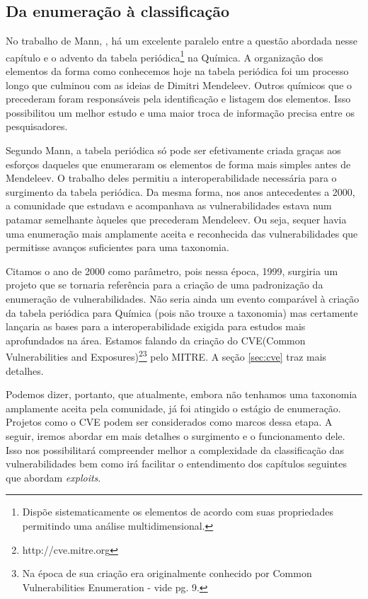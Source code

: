 		\subsection{Da enumeração à classificação}
			No trabalho de Mann, \cite{Mann1999}, há um excelente paralelo entre a
			questão abordada nesse capítulo e o advento da tabela 
			periódica\footnote{Dispõe sistematicamente os elementos de acordo com suas propriedades permitindo
			uma análise multidimensional.} na Química. 
			A organização dos elementos da forma como conhecemos hoje na tabela periódica
			foi um processo longo que culminou com as ideias de Dimitri Mendeleev.
			Outros químicos que o precederam foram responsáveis pela identificação e
			listagem dos elementos. Isso possibilitou um melhor estudo e uma maior
			troca de informação precisa entre os pesquisadores.


			Segundo Mann, a tabela periódica só pode ser efetivamente criada graças
			aos esforços daqueles que enumeraram os elementos de forma mais simples
			antes de Mendeleev. O trabalho deles permitiu a interoperabilidade
			necessária para o surgimento da tabela periódica.
			Da mesma forma, nos anos antecedentes a 2000, a comunidade que estudava
			e acompanhava as vulnerabilidades estava num patamar semelhante àqueles
			que precederam Mendeleev. Ou seja, sequer havia uma enumeração mais
			amplamente aceita e reconhecida das vulnerabilidades que permitisse
			avanços suficientes para uma taxonomia.

			
			Citamos o ano de 2000 como parâmetro, pois nessa época, 1999, surgiria um projeto
			que se tornaria referência para a criação de uma padronização da enumeração
			de vulnerabilidades. Não seria ainda um evento comparável à criação da
			tabela periódica para Química (pois não trouxe a taxonomia) 
			mas certamente lançaria as bases para
			a interoperabilidade exigida para estudos mais aprofundados na área.
			Estamos falando da criação do 
			CVE(Common Vulnerabilities and Exposures)\footnote{http://cve.mitre.org}\footnote{Na época
			de sua criação era originalmente conhecido por Common Vulnerabilities Enumeration - vide
			\cite{Meunier2006} pg. 9.}
			pelo MITRE. A seção \ref{sec:cve} traz mais detalhes.


			Podemos dizer, portanto, que atualmente, embora não tenhamos uma taxonomia
			amplamente aceita pela comunidade, já foi atingido o estágio de enumeração.
			Projetos como o CVE podem ser considerados como marcos dessa etapa.
			A seguir, iremos abordar em mais detalhes o surgimento e o funcionamento dele.
			Isso nos possibilitará compreender melhor a complexidade da classificação
			das vulnerabilidades bem como irá facilitar o entendimento dos capítulos
			seguintes que abordam \textsl{exploits}.
			

